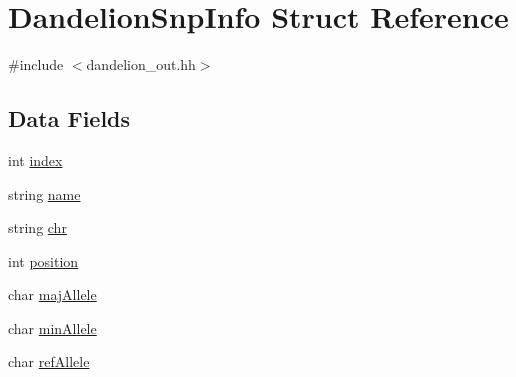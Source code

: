 \hypertarget{structDandelionSnpInfo}{
\section{DandelionSnpInfo Struct Reference}
\label{structDandelionSnpInfo}
}


{\ttfamily \#include $<$dandelion\_\-out.hh$>$}

\subsection*{Data Fields}
\begin{DoxyCompactItemize}
\item 
int \hyperlink{structDandelionSnpInfo_a1fa282f1f892a1b5fd1223ce17e203cb}{index}
\item 
string \hyperlink{structDandelionSnpInfo_aaf39c2953bf283cb8684110114aee7b7}{name}
\item 
string \hyperlink{structDandelionSnpInfo_a8bb8f2cdf3f4261e9f3d8bc04c8940c0}{chr}
\item 
int \hyperlink{structDandelionSnpInfo_a4aaf965cd75aaca6d80a14b2e9a3e0be}{position}
\item 
char \hyperlink{structDandelionSnpInfo_a1657e9bf3a6583c4aa5bf892731a42be}{majAllele}
\item 
char \hyperlink{structDandelionSnpInfo_ae6f55705afbd04f010f075229878c7fc}{minAllele}
\item 
char \hyperlink{structDandelionSnpInfo_a9d8144ecc88436ada470a03fe77bb487}{refAllele}
\end{DoxyCompactItemize}


